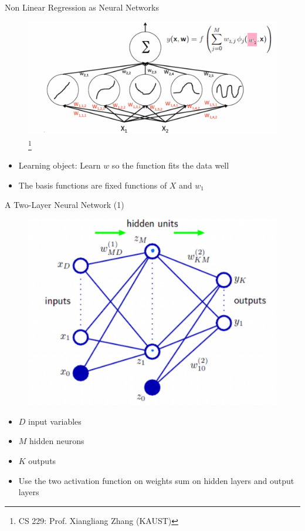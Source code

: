 \documentclass[10pt, hyperref={colorlinks = true,linkcolor = blue}]{beamer}
\begin{document}
{{{\begin{frame}{Non Linear Regression as Neural Networks}
 \begin{figure}
 \includegraphics[width=0.7\linewidth]{figures/NN-NonLM.pdf} \footnote{CS 229: Prof. Xiangliang Zhang (KAUST)}
 \end{figure}
 \begin{itemize}
\item Learning object: Learn $w$ so the function fits the data well
\item The basis functions are fixed functions of $X$ and $ w_1$
 \end{itemize}
\end{frame}

\begin{frame}{A Two-Layer Neural Network (1)}
\begin{figure}
\includegraphics[width=0.65\linewidth]{figures/TwoLayers.pdf}
\end{figure}
\begin{itemize}
\item $D$ input variables
\item $M$ hidden neurons 
\item $K$ outputs 
\item Use the two activation function on weights sum on hidden layers and output layers
\end{itemize}
\end{frame}
}

}}
\end{document}
